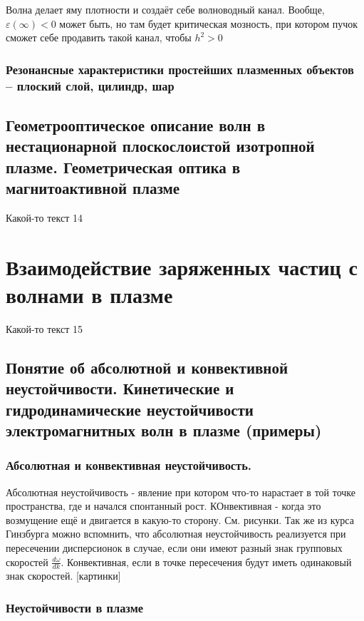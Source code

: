 \documentclass[10pt, a4paper]{article}
\let\stdsection\section
\renewcommand\section{\newpage\stdsection}
\begin{document}
Волна делает яму плотности и создаёт себе волноводный канал. Вообще, $\varepsilon(\infty)<0$ может быть, но там будет критическая мозность, при котором пучок сможет себе продавить такой канал, чтобы $h^2>0$

\subsubsection{Резонансные характеристики простейших плазменных объектов – плоский слой, цилиндр, шар}

\subsection{Геометрооптическое описание волн в нестационарной плоскослоистой изотропной плазме. Геометрическая оптика в магнитоактивной плазме}

Какой-то текст 14

\section{Взаимодействие заряженных частиц с волнами в плазме}

Какой-то текст 15

\subsection{Понятие об абсолютной и конвективной неустойчивости. Кинетические и гидродинамические неустойчивости электромагнитных волн в плазме (примеры)}

\subsubsection{Абсолютная и конвективная неустойчивость.}
Абсолютная неустойчивость - явление при котором что-то нарастает в той точке пространства, где и начался спонтанный рост. КОнвективная - когда это возмущение ещё и двигается в какую-то сторону. См. рисунки. Так же из курса Гинзбурга можно вспомнить, что абсолютная неустойчивость реализуется при пересечении дисперсионок в случае, если они имеют разный знак групповых скоростей $\frac {d\omega}{dk}$. Конвективная, если в точке пересечения будут иметь одинаковый знак скоростей.
[картинки]
\subsubsection{Неустойчивости в плазме} \label{subsec:plasma_B_instabilities}
\end{document}
